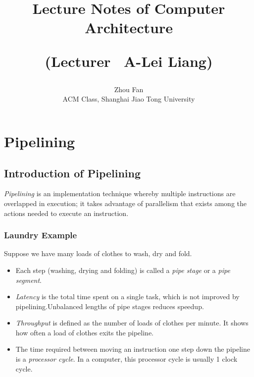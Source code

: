 \documentclass[12pt, a4paper]{article}
\title{Lecture Notes of Computer Architecture\\\begin{large}(Lecturer \ A-Lei Liang)\end{large}}
\author{Zhou Fan\\ACM Class, Shanghai Jiao Tong University}
\date{}
\theoremstyle{margin}
\begin{document}
\maketitle
\tableofcontents
\newpage

\section{Pipelining}

  \subsection{Introduction of Pipelining}

	\indent 

	\emph{Pipelining} is an implementation technique whereby multiple instructions are overlapped in execution; it takes advantage of parallelism that exists among the actions needed to execute an instruction.\cite{caqa}

	\subsubsection{Laundry Example}
	  \indent 

	  Suppose we have many loads of clothes to wash, dry and fold. 

	  \begin{itemize}
		\item Each step (washing, drying and folding) is called a \emph{pipe stage} or a \emph{pipe segment}. 
		\item \emph{Latency} is the total time spent on a single task, which is not improved by pipelining.Unbalanced lengths of pipe stages reduces speedup. 
		\item \emph{Throughput} is defined as the number of loads of clothes per minute. It shows how often a load of clothes exits the pipeline.
		\item The time required between moving an instruction one step down the pipeline is a \emph{processor cycle}. In a computer, this processor cycle is usually 1 clock cycle.\cite{caqa}
	  \end{itemize}
\end{document}

